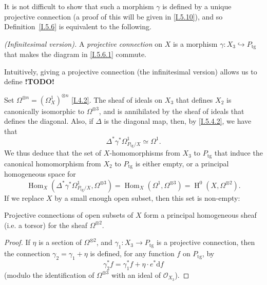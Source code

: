 \documentclass{report}
\theoremstyle{plain}
\newenvironment{proposition}[1]
    {\renewcommand\theinnercustomproposition{#1}\innercustomproposition}
    {\endinnercustomproposition}
\theoremstyle{definition}
\newenvironment{definition}[1]
    {\renewcommand\theinnercustomdefinition{#1}\innercustomdefinition}
    {\endinnercustomdefinition}
\newenvironment{env}[1]
    {\renewcommand\theinnercustomenv{#1}\innercustomenv}
    {\endinnercustomenv}
\newcommand{\sh}[1]{{\mathscr{#1}}}
\newcommand{\dd}{\mathrm{d}}
\newcommand{\tg}{\mathrm{tg}}
\DeclareMathOperator{\Hom}{Hom}
\DeclareMathOperator{\HH}{H}
\newcommand{\todo}{\textbf{ !TODO! }}
\newcommand{\oldpage}[1]{\marginpar{\footnotesize$\Big\vert$ \textit{p.~#1}}}
\begin{document}
It is not difficult to show that such a morphism $\gamma$ is defined by a unique projective connection (a proof of this will be given in \cref{I.5.10}), and so Definition~\cref{I.5.6} is equivalent to the following.

\begin{definition}{5.6~bis}
\label{I.5.6bis}
  \emph{(Infinitesimal version).}
  A \emph{projective connection} on $X$ is a morphism $\gamma\colon X_3\hookrightarrow P_\tg$ that makes the diagram in \cref{I.5.6.1} commute.
\end{definition}

Intuitively, giving a projective connection (the infinitesimal version) allows us to define \todo

\begin{env}{5.7}
\label{I.5.7}
  Set $\Omega^{\otimes n}=(\Omega_X^1)^{\otimes n}$ \cref{I.4.2}.
  The sheaf of ideals on $X_3$ that defines $X_2$ is
\oldpage{32}
  canonically isomorphic to $\Omega^{\otimes3}$, and is annihilated by the sheaf of ideals that defines the diagonal.
  Also, if $\Delta$ is the diagonal map, then, by \cref{I.5.4.2}, we have that
  \[
    \Delta^*\gamma^*\Omega_{P_\tg/X}^1 \simeq \Omega^1.
  \]
  We thus deduce that the set of $X$-homomorphisms from $X_3$ to $P_\tg$ that induce the canonical homomorphism from $X_2$ to $P_\tg$ is either empty, or a principal homogeneous space for
  \[
    \Hom_X(\Delta^*\gamma^*\Omega_{P_\tg/X}^1, \Omega^{\otimes3})
    = \Hom_X(\Omega^1,\Omega^{\otimes3})
    = \HH^0(X,\Omega^{\otimes2}).
  \]
  If we replace $X$ by a small enough open subset, then this set is non-empty:
\end{env}

\begin{proposition}{5.8}
\label{I.5.8}
  Projective connections of open subsets of $X$ form a principal homogeneous sheaf (i.e. a torsor) for the sheaf $\Omega^{\otimes2}$.
\end{proposition}

\begin{proof}
  If $\eta$ is a section of $\Omega^{\otimes2}$, and $\gamma_1\colon X_3\to P_\tg$ is a projective connection, then the connection $\gamma_2=\gamma_1+\eta$ is defined, for any function $f$ on $P_\tg$, by
  \[
  \label{I.5.8.1}
    \gamma_2^*f = \gamma_1^*f + \eta\cdot e^*\dd f
  \tag{5.8.1}
  \]
  (modulo the identification of $\Omega^{\otimes3}$ with an ideal of $\sh{O}_{X_3}$).
\end{proof}
\end{document}
